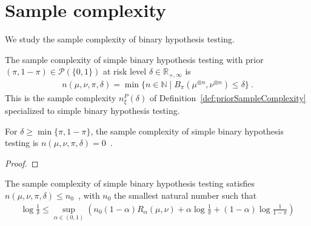 \section{Sample complexity}

We study the sample complexity of binary hypothesis testing.

\begin{definition}
  \label{def:binaryPriorSampleComplexity}
  The sample complexity of simple binary hypothesis testing with prior $(\pi, 1 - \pi) \in \mathcal P(\{0, 1\})$ at risk level $\delta \in \mathbb{R}_{+, \infty}$ is
  \begin{align*}
  n(\mu, \nu, \pi, \delta) = \min\{n \in \mathbb{N} \mid B_\pi(\mu^{\otimes n}, \nu^{\otimes n}) \le \delta\} \: .
  \end{align*}
  This is the sample complexity $n_\xi^P(\delta)$ of Definition~\ref{def:priorSampleComplexity} specialized to simple binary hypothesis testing.
\end{definition}


\begin{lemma}
  \label{lem:binaryPriorSampleComplexity_eq_zero}
  For $\delta \ge \min\{\pi, 1 - \pi\}$, the sample complexity of simple binary hypothesis testing is
  $n(\mu, \nu, \pi, \delta) = 0$~.
\end{lemma}

\begin{proof}
\end{proof}


\begin{lemma}
  \label{lem:binaryPriorSampleComplexity_le_renyi}
  The sample complexity of simple binary hypothesis testing satisfies $n(\mu, \nu, \pi, \delta) \le n_0$~, with $n_0$ the smallest natural number such that
  \begin{align*}
  \log\frac{1}{\delta}
  \le \sup_{\alpha \in (0,1)} \left( n_0 (1 - \alpha)R_\alpha(\mu, \nu) + \alpha\log\frac{1}{\pi} + (1 - \alpha)\log\frac{1}{1 - \pi} \right)
  \end{align*}
\end{lemma}

